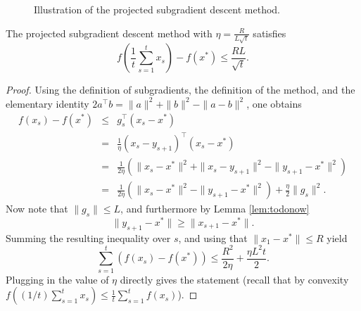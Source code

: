 \documentclass[openany]{now}
\newcommand{\cX}{\mathcal{X}}
\begin{document}
\begin{figure}
\begin{center}
\end{center}
\caption{Illustration of the projected subgradient descent method.}
\label{fig:pgd}
\end{figure}

\begin{theorem} \label{th:pgd}
The projected subgradient descent method with $\eta = \frac{R}{L \sqrt{t}}$ satisfies 
$$f\left(\frac{1}{t} \sum_{s=1}^t x_s\right) - f(x^*) \leq \frac{R L}{\sqrt{t}} .$$
\end{theorem}



\begin{proof}
Using the definition of subgradients, the definition of the method, and the elementary identity $2 a^{\top} b = \|a\|^2 + \|b\|^2 - \|a-b\|^2$, one obtains
\begin{eqnarray*}
f(x_s) - f(x^*) & \leq & g_s^{\top} (x_s - x^*) \\
& = & \frac{1}{\eta} (x_s - y_{s+1})^{\top} (x_s - x^*) \\
& = & \frac{1}{2 \eta} \left(\|x_s - x^*\|^2 + \|x_s - y_{s+1}\|^2 - \|y_{s+1} - x^*\|^2\right) \\
& = & \frac{1}{2 \eta} \left(\|x_s - x^*\|^2 - \|y_{s+1} - x^*\|^2\right) + \frac{\eta}{2} \|g_s\|^2.
\end{eqnarray*}
Now note that $\|g_s\| \leq L$, and furthermore by Lemma \ref{lem:todonow}
$$\|y_{s+1} - x^*\| \geq \|x_{s+1} - x^*\| .$$
Summing the resulting inequality over $s$, and using that $\|x_1 - x^*\| \leq R$ yield
$$\sum_{s=1}^t \left( f(x_s) - f(x^*) \right) \leq \frac{R^2}{2 \eta} + \frac{\eta L^2 t}{2} .$$
Plugging in the value of $\eta$ directly gives the statement (recall that by convexity $f((1/t) \sum_{s=1}^t x_s) \leq \frac1{t} \sum_{s=1}^t f(x_s)$).
\end{proof}
\end{document}
